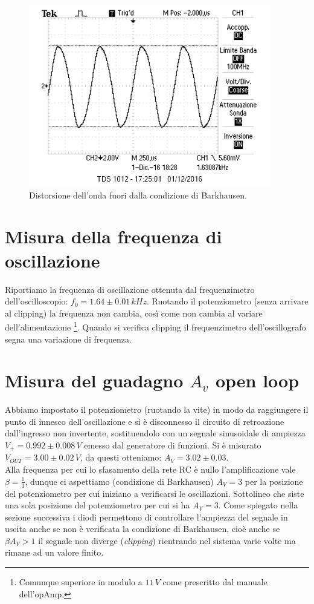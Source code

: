 \documentclass[10pt,a4paper]{article}
\begin{document}
\begin{figure}[!htb]
  \centering
  \includegraphics[scale=.5]{ondaDistorta.png}
\caption{Distorsione dell'onda fuori dalla condizione di Barkhausen.}
\label{distorta}
\end{figure}

\section{Misura della frequenza di oscillazione}
Riportiamo la frequenza di oscillazione ottenuta dal frequenzimetro dell'oscilloscopio: $f_0 = 1.64 \pm 0.01 \, kHz$. Ruotando il potenziometro (senza arrivare al clipping) la frequenza non cambia, così come non cambia al variare dell'alimentazione \footnote{Comunque superiore in modulo a $11\,V$ come prescritto dal manuale dell'opAmp.}. Quando si verifica clipping il frequenzimetro dell'oscillografo segna una variazione di frequenza.\\

\section{Misura del guadagno $A_v$ open loop}
Abbiamo impostato il potenziometro (ruotando la vite) in modo da raggiungere il punto di innesco dell’oscillazione e si è disconnesso il circuito di retroazione dall’ingresso non invertente, sostituendolo con un segnale sinusoidale di ampiezza $V_+=0.992 \pm 0.008\,V$ emesso dal generatore di funzioni. Si è misurato $V_{OUT} = 3.00 \pm 0.02 \,V$, da questi otteniamo: $A_V = 3.02 \pm 0.03$.\\

Alla frequenza per cui lo sfasamento della rete RC è nullo l'amplificazione vale $\beta = \frac{1}{3}$, dunque ci aspettiamo (condizione di Barkhausen) $A_V = 3$ per la posizione del potenziometro per cui iniziano a verificarsi le oscillazioni. Sottolineo che siste una sola posizione del potenziometro per cui si ha $A_V = 3$. Come spiegato nella sezione successiva i diodi permettono di controllare l'ampiezza del segnale in uscita anche se non è verificata la condizione di Barkhausen, cioè anche se $\beta A_V > 1$ il segnale non diverge (\emph{clipping}) rientrando nel sistema varie volte ma rimane ad un valore finito.
\end{document}
